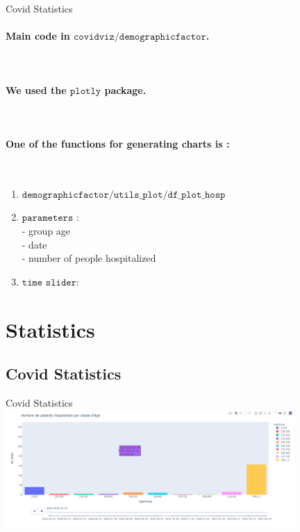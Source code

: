 \documentclass[11pt, compress, tikz, xcolor=table]{beamer}
\theoremstyle{definition}
\begin{document}
\begin{frame}[fragile]{Covid Statistics} 

\paragraph{Main code in $\texttt{covidviz/demographicfactor}$.}\\

\paragraph{We used the $\texttt{plotly}$ package.}\\

\paragraph{One of the functions for generating charts is :}\\
 \begin{enumerate}
    \item $\texttt{demographicfactor/utils\_plot/df\_plot\_hosp}$
    \item $\texttt{parameters :}$\\
        - group age\\
        - date\\
        - number of people hospitalized\\
    \item $\texttt{time slider:}$\\

    
\end{enumerate}

\end{frame}

\section{Statistics}

\subsection{Covid Statistics}
\begin{frame}[fragile]{Covid Statistics}
      \includegraphics[width=11cm]{images/nombre_patient.PNG}
      
\end{frame}
\end{document}
